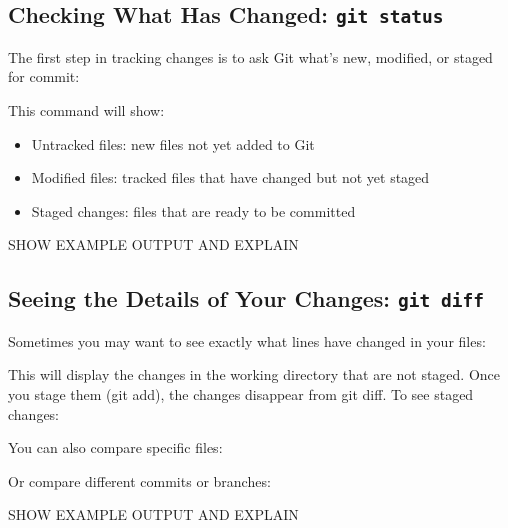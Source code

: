 \subsection*{Checking What Has Changed: \texttt{git status}}
The first step in tracking changes is to ask Git what’s new, modified, or staged for commit:
\begin{terminal}
\end{terminal}
This command will show:
\begin{itemize}
\item Untracked files: new files not yet added to Git
\item Modified files: tracked files that have changed but not yet staged
\item Staged changes: files that are ready to be committed
\end{itemize}

SHOW EXAMPLE OUTPUT AND EXPLAIN

\subsection*{Seeing the Details of Your Changes: \texttt{git diff}}
Sometimes you may want to see exactly what lines have changed in your files:
\begin{terminal}
\end{terminal}
\noindent This will display the changes in the working directory that are not staged. Once you stage them (git add), the changes disappear from git diff. To see staged changes:
\begin{terminal}
\end{terminal}
\noindent You can also compare specific files:
\begin{terminal}
\end{terminal}
\noindent Or compare different commits or branches:
\begin{terminal}
\end{terminal}

SHOW EXAMPLE OUTPUT AND EXPLAIN

